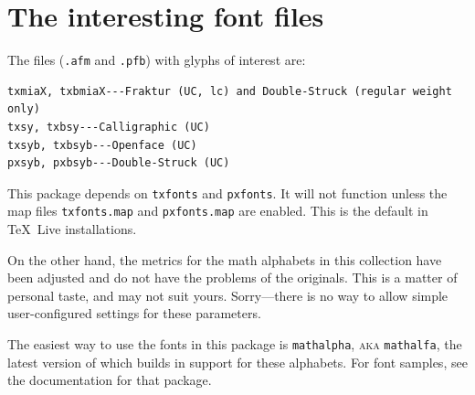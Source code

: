 \documentclass[11pt]{article}
\begin{document}
\section{The interesting font files}
The files ({\tt.afm} and {\tt.pfb}) with glyphs of interest are:
\begin{verbatim}
txmiaX, txbmiaX---Fraktur (UC, lc) and Double-Struck (regular weight only)
txsy, txbsy---Calligraphic (UC)
txsyb, txbsyb---Openface (UC)
pxsyb, pxbsyb---Double-Struck (UC)
\end{verbatim}

 This package depends on {\tt txfonts} and {\tt pxfonts}. It will not function unless the map files {\tt txfonts.map} and {\tt pxfonts.map} are enabled. This is the default in \TeX\ Live installations.


On the other hand, the metrics for the math alphabets in this collection have been adjusted and do not have the problems of the originals. This is a matter of personal taste, and may not suit yours. Sorry---there is no way to allow simple user-configured settings for these parameters.

The easiest way to use the fonts in this package is {\tt mathalpha}, \textsc{aka} {\tt mathalfa}, the latest version of which builds in support for these alphabets. For font samples, see the documentation for that package.
\end{document}
